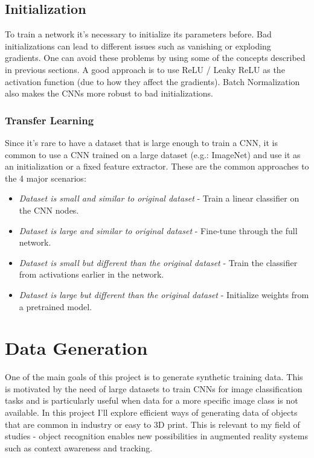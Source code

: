 \documentclass[10pt,a4paper]{article}
\begin{document}
\subsection{Initialization}
To train a network it's necessary to initialize its parameters before. Bad initializations can lead to different issues such as vanishing or exploding gradients. One can avoid these problems by using some of the concepts described in previous sections. A good approach is to use ReLU / Leaky ReLU as the activation function (due to how they affect the gradients). Batch Normalization also makes the CNNs more robust to bad initializations.

\subsubsection{Transfer Learning}
Since it's rare to have a dataset that is large enough to train a CNN, it is common to use a CNN trained on a large dataset (e.g.: ImageNet) and use it as an initialization or a fixed feature extractor.\cite{stanfordtf} These are the common approaches to the 4 major scenarios:
\begin{itemize}
\item \textit{Dataset is small and similar to original dataset} - Train a linear classifier on the CNN nodes.
\item \textit{Dataset is large and similar to original dataset} - Fine-tune through the full network.
\item \textit{Dataset is small but different than the original dataset} - Train the classifier from activations earlier in the network.
\item \textit{Dataset is large but different than the original dataset} - Initialize weights from a pretrained model.
\end{itemize} 
	
\section{Data Generation}
One of the main goals of this project is to generate synthetic training data. This is motivated by the need of large datasets to train CNNs for image classification tasks and is particularly useful when data for a more specific image class is not available. In this project I'll explore efficient ways of generating data of objects that are common in industry or easy to 3D print. This is relevant to my field of studies - object recognition enables new possibilities in augmented reality systems such as context awareness and tracking.
\end{document}
